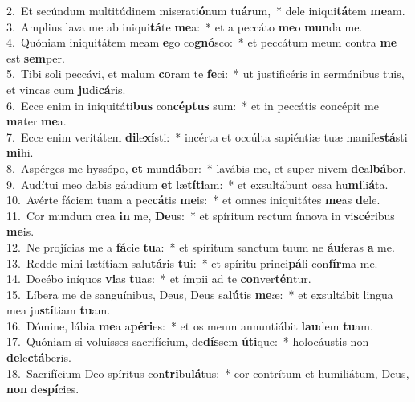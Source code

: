 {2.~}Et secúndum multitúdinem miserati\textbf{ó}num tu\textbf{á}rum,~* dele iniqui\textbf{tá}tem \textbf{me}am.\\
{3.~}Amplius lava me ab iniqui\textbf{tá}te \textbf{me}a:~* et a peccáto \textbf{me}o \textbf{mun}da me.\\
{4.~}Quóniam iniquitátem meam \textbf{e}go co\textbf{gnó}sco:~* et peccátum meum contra \textbf{me} est \textbf{sem}per.\\
{5.~}Tibi soli peccávi, et malum \textbf{co}ram te \textbf{fe}ci:~* ut justificéris in sermónibus tuis, et vincas cum \textbf{ju}di\textbf{cá}ris.\\
{6.~}Ecce enim in iniquitáti\textbf{bus} con\textbf{cép}\textbf{tus} sum:~* et in peccátis concépit me \textbf{ma}ter \textbf{me}a.\\
{7.~}Ecce enim veritátem \textbf{di}le\textbf{xí}sti:~* incérta et occúlta sapiéntiæ tuæ manife\textbf{stá}sti \textbf{mi}hi.\\
{8.~}Aspérges me hyssópo, \textbf{et} mun\textbf{dá}bor:~* lavábis me, et super nivem \textbf{de}al\textbf{bá}bor.\\
{9.~}Audítui meo dabis gáudium \textbf{et} læ\textbf{tí}\textbf{ti}am:~* et exsultábunt ossa hu\textbf{mi}li\textbf{á}ta.\\
{10.~}Avérte fáciem tuam a pec\textbf{cá}tis \textbf{me}is:~* et omnes iniquitátes \textbf{me}as \textbf{de}le.\\
{11.~}Cor mundum crea \textbf{in} me, \textbf{De}us:~* et spíritum rectum ínnova in vi\textbf{scé}ribus \textbf{me}is.\\
{12.~}Ne projícias me a \textbf{fá}cie \textbf{tu}a:~* et spíritum sanctum tuum ne \textbf{áu}feras \textbf{a} me.\\
{13.~}Redde mihi lætítiam salu\textbf{tá}ris \textbf{tu}i:~* et spíritu princi\textbf{pá}li con\textbf{fír}ma me.\\
{14.~}Docébo iníquos \textbf{vi}as \textbf{tu}as:~* et ímpii ad te \textbf{con}ver\textbf{tén}tur.\\
{15.~}Líbera me de sanguínibus, Deus, Deus sa\textbf{lú}tis \textbf{me}æ:~* et exsultábit lingua mea ju\textbf{stí}tiam \textbf{tu}am.\\
{16.~}Dómine, lábia \textbf{me}a a\textbf{pé}\textbf{ri}es:~* et os meum annuntiábit \textbf{lau}dem \textbf{tu}am.\\
{17.~}Quóniam si voluísses sacrifícium, de\textbf{dís}sem \textbf{ú}\textbf{ti}que:~* holocáustis non \textbf{de}le\textbf{ctá}beris.\\
{18.~}Sacrifícium Deo spíritus con\textbf{tri}bu\textbf{lá}tus:~* cor contrítum et humiliátum, Deus, \textbf{non} de\textbf{spí}cies.\\
